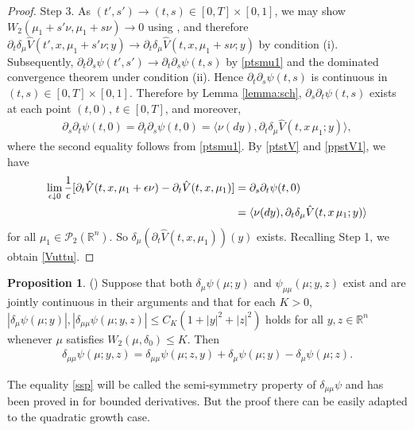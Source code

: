\documentclass{amsart}
\theoremstyle{definition}
\newtheorem{proposition}[theorem]{Proposition}
\theoremstyle{remark}
\numberwithin{equation}{section}
\begin{document}
\begin{proof}
Step 3. As $(t',s')\to (t,s)\in [0,T]\times [0,1]$, we may show $W_2(\mu_1+s'\nu, \mu_1+s\nu)\to 0$ using \cite[Theorem 6.9]{V09}, and therefore $\partial_t\delta_\mu \hat V (t',x, \mu_1+s'\nu; y)\to \partial_t\delta_\mu \hat V(t,x,\mu_1+s\nu;y)$ by condition (i). Subsequently, $\partial_t\partial_s \psi(t',s') \to\partial_t\partial_s \psi(t,s) $ by
\eqref{ptsmu1} and the dominated convergence theorem under condition (ii). Hence $\partial_t\partial_s \psi(t,s)$ is  continuous in $(t,s)\in [0,T]\times [0,1]$.  Therefore by Lemma \ref{lemma:sch}, $\partial_s\partial_t \psi(t,s)$ exists  at each point $(t, 0)$, $t\in [0,T]$, and moreover,
\begin{align}
 \partial_s\partial_t \psi(t,0) = \partial_t\partial_s \psi(t,0)=\langle \nu(dy),\partial_t \delta_\mu \hat V(t,x \, \mu_1; y)\rangle,
\label{ppstV1}
\end{align}
where the second equality follows from \eqref{ptsmu1}.
By \eqref{ptstV} and \eqref{ppstV1}, we have
\begin{align}
\lim_{\epsilon \downarrow 0 } \frac{1}{\epsilon}[ \partial_t \hat V(t, x, \mu_1+\epsilon \nu)-\partial_t \hat V(t, x, \mu_1) ]
& =\partial_s\partial_t \psi(t,0)\notag \\
& =\langle \nu(dy),\partial_t \delta_\mu \hat V(t,x \, \mu_1; y)\rangle \notag
\end{align}
for all $\mu_1\in {\mathcal P}_2(\mathbb{R}^n)$.
So $\delta_\mu (\partial_t \hat V(t,x,\mu_1))(y)$ exists. Recalling Step 1,
 we obtain \eqref{Vuttu}.
\end{proof}




\begin{proposition}  (\cite{CDLL19})
Suppose that both $\delta_{\mu}\psi(\mu;y)$ and $\psi_{\mu\mu}(\mu;y,z)$
exist and are jointly continuous in  their arguments and
that for each $K>0$,  $|\delta_{\mu}\psi(\mu;y)|, |\delta_{\mu\mu} \psi(\mu; y,z)|\le C_K(1+|y|^2+|z|^2)$ holds for all $y, z\in \mathbb{R}^n$ whenever $\mu$ satisfies $W_2(\mu, \delta_0)\le K$.
Then
\begin{align}\label{ssp}
\delta_{\mu\mu}\psi(\mu; y,z) =\delta_{\mu\mu} \psi(\mu; z,y)
+\delta_\mu \psi(\mu;y) -\delta_\mu \psi(\mu; z).
\end{align}
\end{proposition}

The equality \eqref{ssp} will be called the semi-symmetry property of $\delta_{\mu\mu}\psi $ and has been proved in \cite{CDLL19} for bounded derivatives. But the proof there can be easily adapted to the quadratic growth case.
\end{document}
